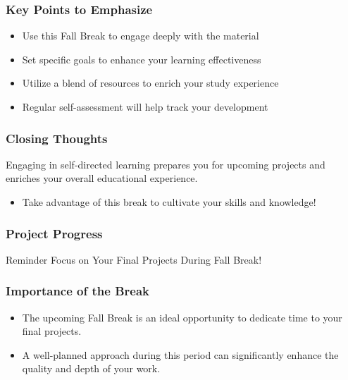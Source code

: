 \documentclass[aspectratio=169]{beamer}
\begin{document}
\begin{frame}[fragile]
    \frametitle{Key Points to Emphasize}
    \begin{itemize}
        \item Use this Fall Break to engage deeply with the material
        \item Set specific goals to enhance your learning effectiveness
        \item Utilize a blend of resources to enrich your study experience
        \item Regular self-assessment will help track your development
    \end{itemize}
\end{frame}

\begin{frame}[fragile]
    \frametitle{Closing Thoughts}
    Engaging in self-directed learning prepares you for upcoming projects and enriches your overall educational experience. 
    \begin{itemize}
        \item Take advantage of this break to cultivate your skills and knowledge!
    \end{itemize}
\end{frame}

\begin{frame}[fragile]
    \frametitle{Project Progress}
    \begin{block}{Reminder}
        Focus on Your Final Projects During Fall Break!
    \end{block}
\end{frame}

\begin{frame}[fragile]
    \frametitle{Importance of the Break}
    \begin{itemize}
        \item The upcoming Fall Break is an ideal opportunity to dedicate time to your final projects.
        \item A well-planned approach during this period can significantly enhance the quality and depth of your work.
    \end{itemize}
\end{frame}
\end{document}
